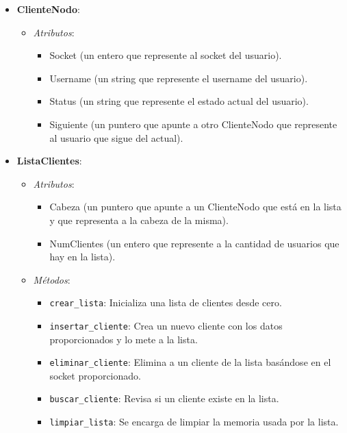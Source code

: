 \documentclass{article}
\begin{document}
\begin{itemize}
    \item \textbf{ClienteNodo}:
    \begin{itemize}
        \item \textit{Atributos}:
        \begin{itemize}
            \item Socket (un entero que represente al socket del usuario).
            \item Username (un string que represente el username del usuario).
            \item Status (un string que represente el estado actual del usuario).
            \item Siguiente (un puntero que apunte a otro ClienteNodo que represente al usuario que sigue del actual).
        \end{itemize}
    \end{itemize}

    \item \textbf{ListaClientes}:
    \begin{itemize}
        \item \textit{Atributos}:
        \begin{itemize}
            \item Cabeza (un puntero que apunte a un ClienteNodo que está en la lista y que representa a la cabeza de la misma).
            \item NumClientes (un entero que represente a la cantidad de usuarios que hay en la lista).
        \end{itemize}
        \item \textit{Métodos}:
        \begin{itemize}
            \item \texttt{crear\_lista}: Inicializa una lista de clientes desde cero.
            \item \texttt{insertar\_cliente}: Crea un nuevo cliente con los datos proporcionados y lo mete a la lista.
            \item \texttt{eliminar\_cliente}: Elimina a un cliente de la lista basándose en el socket proporcionado.
            \item \texttt{buscar\_cliente}: Revisa si un cliente existe en la lista.
            \item \texttt{limpiar\_lista}: Se encarga de limpiar la memoria usada por la lista.
        \end{itemize}
    \end{itemize}


\end{itemize}
\end{document}
